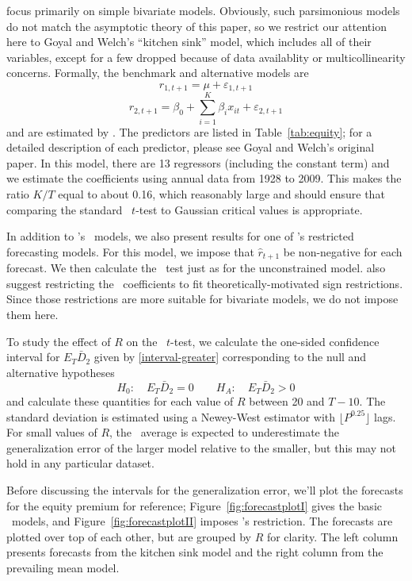 \documentclass[11pt]{article}
\newcommand{\citepos}[1]{\citeauthor{#1}'s \citeyearpar{#1}}
\begin{document}
\citet{goyal-welch-2008-rfs} focus primarily on simple bivariate
models.  Obviously, such parsimonious models do not match the
asymptotic theory of this paper, so we restrict our attention here to
Goyal and Welch's ``kitchen sink'' model, which includes all of their
variables, except for a few dropped because of data availablity or
multicollinearity concerns.  Formally, the benchmark and alternative
models are
\begin{equation}
  \label{eq:3}
  r_{1,t+1} = \mu + \varepsilon_{1,t+1}
\end{equation}
\begin{equation}
  \label{eq:2}
r_{2,t+1} = \beta_0 + \sum_{i=1}^K \beta_{i} x_{it} + \varepsilon_{2,t+1}  
\end{equation}
and are estimated by \ols.  The predictors are listed in
Table~\ref{tab:equity}; for a detailed description of each predictor,
please see Goyal and Welch's original paper.  In this model, there are
13 regressors (including the constant term) and we estimate the
coefficients using annual data from 1928 to 2009.  This makes the
ratio $K/T$ equal to about 0.16, which reasonably large and should
ensure that comparing the standard \oos\ $t$-test to Gaussian critical
values is appropriate.

In addition to \citepos{goyal-welch-2008-rfs} \ols\ models, we also
present results for one of \citepos{campbell-thompson-2008-rfs}
restricted forecasting models.  For this model, we impose that $\hat
r_{t+1}$ be non-negative for each forecast.  We then calculate the
\oos\ test just as for the unconstrained model.
\citet{campbell-thompson-2008-rfs} also suggest restricting the \ols\
coefficients to fit theoretically-motivated sign restrictions.  Since
those restrictions are more suitable for bivariate models, we do not
impose them here.

To study the effect of $R$ on the \oos\ $t$-test, we calculate the
one-sided confidence interval for $E_T \bar D_2$ given by
\eqref{interval-greater} corresponding to the null and alternative
hypotheses
\[ H_0: \quad E_T \bar D_2 = 0 \qquad
H_A: \quad E_T \bar D_2 > 0
\]
and calculate these quantities for each value of $R$ between 20 and
$T-10$.  The standard deviation is estimated using a Newey-West
estimator with $\lfloor P^{0.25}\rfloor$ lags.  For small values of
$R$, the \oos\ average is expected to underestimate the generalization
error of the larger model relative to the smaller, but this may not
hold in any particular dataset.

Before discussing the intervals for the generalization error, we'll
plot the forecasts for the equity premium for reference;
Figure~\ref{fig:forecastplotI} gives the basic \ols\ models, and
Figure~\ref{fig:forecastplotII} imposes
\citepos{campbell-thompson-2008-rfs} restriction.  The forecasts are
plotted over top of each other, but are grouped by $R$ for clarity.
The left column presents forecasts from the kitchen sink model and
the right column from the prevailing mean model.
\end{document}
